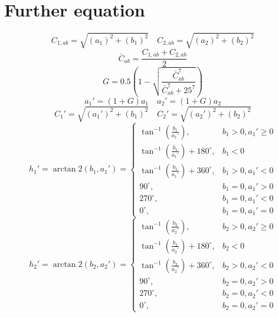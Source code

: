 \appendix
\section{Further equation}\label{further equation}
\begin{equation}
C_{1,ab}=\sqrt{(a_{1})^{2}+(b_{1})^{2}} \quad C_{2,ab}=\sqrt{(a_{2})^{2}+(b_{2})^{2}}
\end{equation}
\begin{equation}
\bar{C}_{ab}=\frac{C_{1,ab}+C_{2,ab}}{2}
\end{equation}
\begin{equation}
G = 0.5\left(1-\sqrt{\frac{\bar{C}_{ab}^{7}}{\bar{C}_{ab}^{7}+25^7}}\right)
\end{equation}
\begin{equation}
a_{1}'=(1+G)a_{1} \quad a_{2}'=(1+G)a_{2} 
\end{equation}
\begin{equation}
C_{1}'=\sqrt{(a_{1}')^{2}+(b_{1})^2} \quad C_{2}'=\sqrt{(a_{2}')^{2}+(b_{2})^2}
\end{equation}
\begin{equation}
h_{1}' = \arctan2(b_{1},a_{1}') =
\begin{cases}
\tan^{-1}(\frac{b_{1}}{a_{1}'}), & b_{1}>0,a_{1}' \geq 0\\
\tan^{-1}(\frac{b_{1}}{a_{1}'})+180^{\circ}, & b_{1}<0\\
\tan^{-1}(\frac{b_{1}}{a_{1}'})+360^{\circ}, & b_{1}>0,a_{1}'<0 \\
90^{\circ}, & b_{1}=0,a_{1}'>0\\
270^{\circ}, & b_{1}=0,a_{1}'<0\\
0^{\circ}, & b_{1}=0,a_{1}'=0
\end{cases}
\end{equation}
\begin{equation}
h_{2}' = \arctan2(b_{2},a_{2}') =
\begin{cases}
\tan^{-1}\left(\frac{b_{2}}{a_{2}'}\right), & b_{2}>0,a_{2}' \geq 0\\
\tan^{-1}\left(\frac{b_{2}}{a_{2}'}\right)+180^{\circ}, & b_{2}<0\\
\tan^{-1}\left(\frac{b_{2}}{a_{2}'}\right)+360^{\circ}, & b_{2}>0,a_{2}'<0 \\
90^{\circ}, & b_{2}=0,a_{2}'>0\\
270^{\circ}, & b_{2}=0,a_{2}'<0\\
0^{\circ}, & b_{2}=0,a_{2}'=0
\end{cases}
\end{equation}
